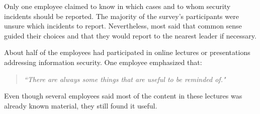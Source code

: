 \documentclass[b5paper, twoside, openright, 11pt]{report}
\begin{document}
Only one employee claimed to know in which cases and to whom security incidents should be reported. The majority of the survey's participants were unsure which incidents to report. Nevertheless, most said that common sense guided their choices and that they would report to the nearest leader if necessary.

About half of the employees had participated in online lectures or presentations addressing information security. One employee emphasized that:

\begin{quote}
\textit{``There are always some things that are useful to be reminded of."}
\end{quote}

Even though several employees said most of the content in these lectures was already known material, they still found it useful.
\end{document}

